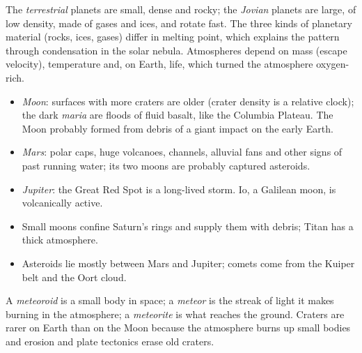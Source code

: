 The \emph{terrestrial} planets are small,
dense and rocky; the \emph{Jovian} planets
are large, of low density, made of gases
and ices, and rotate fast. The three kinds
of planetary material (rocks, ices, gases)
differ in melting point, which explains the
pattern through condensation in the solar
nebula. Atmospheres depend on mass (escape
velocity), temperature and, on Earth, life,
which turned the atmosphere oxygen-rich.

\begin{itemize}
\item \emph{Moon}: surfaces with more
craters are older (crater density is a
relative clock); the dark \emph{maria} are
floods of fluid basalt, like the Columbia
Plateau. The Moon probably formed from
debris of a giant impact on the early
Earth.
\item \emph{Mars}: polar caps, huge
volcanoes, channels, alluvial fans and
other signs of past running water; its two
moons are probably captured asteroids.
\item \emph{Jupiter}: the Great Red Spot is
a long-lived storm. Io, a Galilean moon,
is volcanically active.
\item Small moons confine Saturn's rings
and supply them with debris; Titan has a
thick atmosphere.
\item Asteroids lie mostly between Mars
and Jupiter; comets come from the Kuiper
belt and the Oort cloud.
\end{itemize}

A \emph{meteoroid} is a small body in
space; a \emph{meteor} is the streak of
light it makes burning in the atmosphere; a
\emph{meteorite} is what reaches the
ground. Craters are rarer on Earth than on
the Moon because the atmosphere burns up
small bodies and erosion and plate
tectonics erase old craters.





